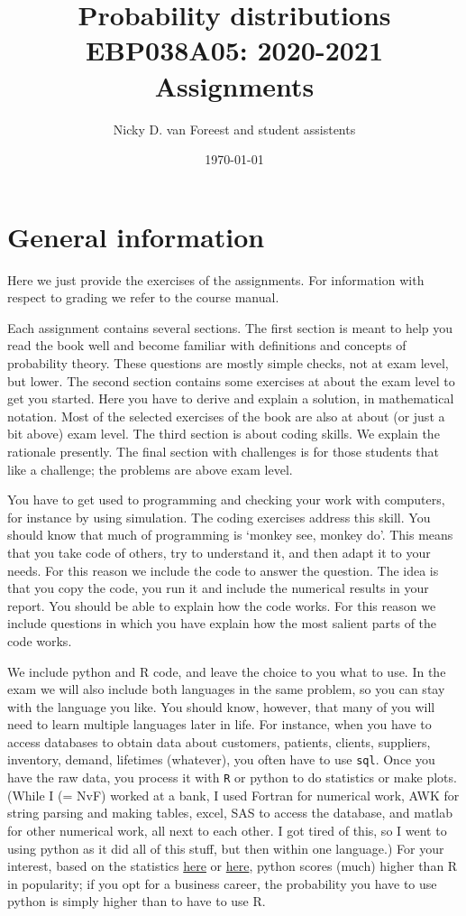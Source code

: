 \documentclass[a4paper,11pt]{article}
\author{Nicky D. van Foreest and student assistents}
\date{\today}
\title{Probability distributions EBP038A05: 2020-2021\\
Assignments}
\begin{document}
\maketitle
\tableofcontents


\section*{General information}
\label{sec:orgb865fed}

Here we just provide the exercises of the assignments.  For information with respect to grading we refer to the  course manual.


Each assignment contains several sections.
The first section is meant to help you read the book well and become familiar with definitions and concepts of probability theory.
These questions are mostly simple checks, not at exam level, but lower.
The second section contains some exercises at about the exam level to get you started.
Here you have to derive and explain a solution, in mathematical notation.
Most of the selected exercises of the book are also at about (or just a bit above) exam level.
The third section is about coding skills.
We explain the rationale presently.
The final section with challenges is for those students that like a challenge; the problems are above exam level.


You have to get used to programming and checking your work with computers, for instance by using simulation.
The coding exercises address this skill.
You should know that much of programming is `monkey see, monkey do'.
This means that you take code of others, try to understand it, and then adapt it to your needs.
For this reason we include the code to answer the question.
The idea is that you copy the code, you  run it and include the numerical results in your report. You should be able to explain how the code works. For this reason we include questions in which you have explain how the most salient parts of the code works.

We include python and R code, and leave the choice to you what to use.
In the exam we will also include both languages in the same problem, so you can stay with the language you like.
You should know, however, that many of you will need to learn multiple languages later in life.
For instance, when you have to access databases to obtain data about customers, patients, clients, suppliers, inventory, demand, lifetimes (whatever), you often have to use \texttt{sql}.
Once you have the raw data, you process it with \texttt{R} or python to do statistics or make plots.
(While I (= NvF) worked at a bank, I used Fortran for numerical work, AWK for string parsing and making tables, excel, SAS to access the database, and matlab for other numerical work, all next to each other.
I got tired of this, so I went to using python as it did all of this stuff, but then within one language.)
For your interest, based on the statistics \href{https://www.tiobe.com/tiobe-index/}{here} or \href{https://www.northeastern.edu/graduate/blog/most-popular-programming-languages/}{here}, python scores (much) higher than R in popularity; if you opt for a business career, the probability you have to use python is simply higher than to have to use R.
\end{document}
